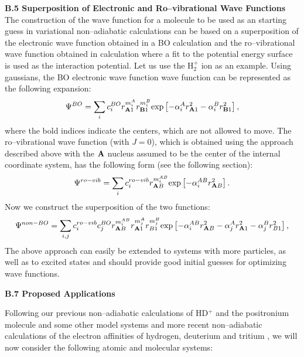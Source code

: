 \vspace{2mm}
\noindent
{\bf B.5 Superposition of Electronic and Ro--vibrational Wave Functions}
The construction of the wave function for a molecule 
to be used as an
starting guess in variational non--adiabatic calculations
can be based on a superposition of the electronic wave function
obtained in a BO calculation and the ro--vibrational wave function
obtained in calculation where a fit to the potential energy
surface is used as the interaction potential. Let us use the H$_2^+$
ion as an example. Using gaussians, the BO electronic wave function 
wave function can be represented as the following expansion:
\begin{equation}
\Psi^{BO} = 
\sum_i c_i^{BO} r_{ {\bf A}1}^{m_i^A} r_{ {\bf B}1}^{m_i^B}
{\rm exp} \left[ -\alpha_i^A r_{ {\bf A}1}^2 
- \alpha_i^B r_{ {\bf B}1}^2 \right],
\label{BO1}
\end{equation}
where the bold indices indicate the centers, which are not allowed to move.
The ro--vibrational wave function (with $J=0$), which is obtained using the
approach described above with the ${\bf A}$ nucleus assumed to be
the center of the internal coordinate system, has the following form
(see the following section):
\begin{equation}
\Psi^{ro-vib} = 
\sum_i c_i^{ro-vib} r_{ {\bf A}B}^{m_i^{AB}} 
{\rm exp} \left[ -\alpha_i^{AB} r_{ {\bf A}B}^2 \right].
\label{BO2}
\end{equation}
Now we construct the superposition of the two functions:
\begin{equation}
\Psi^{non-BO} = 
\sum_{i,j} c_i^{ro-vib} c_j^{BO} 
r_{ {\bf A}B}^{m_i^{AB}}
r_{ {\bf A}1}^{m_j^A} r_{B1}^{m_j^B}
{\rm exp} 
\left[ -\alpha_i^{AB} r_{ {\bf A}B}^2 -\alpha_j^A r_{ {\bf A}1}^2 
- \alpha_j^B r_{B1}^2 \right],
\label{BO3}
\end{equation}
The above approach can easily be extended to systems with more particles,
as well as to excited states
and should provide good initial guesses for optimizing wave functions.



\vspace{2mm}
\noindent
{\bf B.7 Proposed Applications}


Following our previous non--adiabatic calculations of HD$^+$
and the positronium molecule and some other model systems
\cite{A3,A6,A16,A27,kozlowski91,%
kozlowski92b,kozlowski92c} and more 
recent non--adiabatic calculations
of the electron affinities of hydrogen, deuterium and tritium
\cite{A37},
we will now consider the following atomic and molecular systems:



